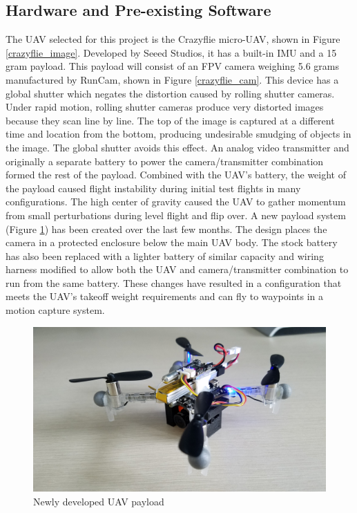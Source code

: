 \documentclass[12pt]{article}
\begin{document}
\subsection{Hardware and Pre-existing Software}
The UAV selected for this project is the Crazyflie micro-UAV, shown in Figure \ref{crazyflie_image}. Developed by Seeed Studios, it has a built-in IMU and a 15 gram payload. This payload will consist of an FPV camera weighing 5.6 grams manufactured by RunCam, shown in Figure \ref{crazyflie_cam}. This device has a global shutter which negates the distortion caused by rolling shutter cameras. Under rapid motion, rolling shutter cameras produce very distorted images because they scan line by line. The top of the image is captured at a different time and location from the bottom, producing undesirable smudging of objects in the image. The global shutter avoids this effect. An analog video transmitter and originally a separate battery to power the camera/transmitter combination formed the rest of the payload. Combined with the UAV's battery, the weight of the payload caused flight instability during initial test flights in many configurations. The high center of gravity caused the UAV to gather momentum from small perturbations during level flight and flip over. A new payload system (Figure \ref{payload}) has been created over the last few months. The design places the camera in a protected enclosure below the main UAV body. The stock battery has also been replaced with a lighter battery of similar capacity and wiring harness modified to allow both the UAV and camera/transmitter combination to run from the same battery. These changes have resulted in a configuration that meets the UAV's takeoff weight requirements and can fly to waypoints in a motion capture system.

\begin{figure}
    \centering
    \includegraphics[scale=0.075]{payload1}
    \vspace{10pt}
    \caption[Newly developed UAV payload]{Newly developed UAV payload}
    \label{payload}
\end{figure}
\end{document}
